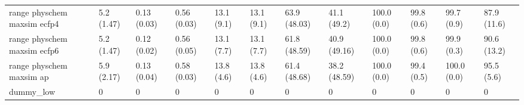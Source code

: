 \begin{tabular}{llllllllllll}
range physchem maxsim ecfp4 & {\cellcolor[HTML]{F1FAFC}} \color[HTML]{000000} 5.2 (1.47) & {\cellcolor[HTML]{E0F3F5}} \color[HTML]{000000} 0.13 (0.03) & {\cellcolor[HTML]{54B88E}} \color[HTML]{F1F1F1} 0.56 (0.03) & {\cellcolor[HTML]{E4F5F8}} \color[HTML]{000000} 13.1 (9.1) & {\cellcolor[HTML]{E4F5F8}} \color[HTML]{000000} 13.1 (9.1) & {\cellcolor[HTML]{3EAA70}} \color[HTML]{F1F1F1} 63.9 (48.03) & {\cellcolor[HTML]{8AD2BE}} \color[HTML]{000000} 41.1 (49.2) & {\cellcolor[HTML]{00441B}} \color[HTML]{F1F1F1} 100.0 (0.0) & {\cellcolor[HTML]{00441B}} \color[HTML]{F1F1F1} 99.8 (0.6) & {\cellcolor[HTML]{00441B}} \color[HTML]{F1F1F1} 99.7 (0.9) & {\cellcolor[HTML]{006B2B}} \color[HTML]{F1F1F1} 87.9 (11.6) \\
range physchem maxsim ecfp6 & {\cellcolor[HTML]{F0F9FB}} \color[HTML]{000000} 5.2 (1.47) & {\cellcolor[HTML]{E1F4F6}} \color[HTML]{000000} 0.12 (0.02) & {\cellcolor[HTML]{55B98F}} \color[HTML]{F1F1F1} 0.56 (0.05) & {\cellcolor[HTML]{E4F5F8}} \color[HTML]{000000} 13.1 (7.7) & {\cellcolor[HTML]{E4F5F8}} \color[HTML]{000000} 13.1 (7.7) & {\cellcolor[HTML]{43AF78}} \color[HTML]{F1F1F1} 61.8 (48.59) & {\cellcolor[HTML]{8CD2BF}} \color[HTML]{000000} 40.9 (49.16) & {\cellcolor[HTML]{00441B}} \color[HTML]{F1F1F1} 100.0 (0.0) & {\cellcolor[HTML]{00441B}} \color[HTML]{F1F1F1} 99.8 (0.6) & {\cellcolor[HTML]{00441B}} \color[HTML]{F1F1F1} 99.9 (0.3) & {\cellcolor[HTML]{006328}} \color[HTML]{F1F1F1} 90.6 (13.2) \\
range physchem maxsim ap & {\cellcolor[HTML]{EFF9FB}} \color[HTML]{000000} 5.9 (2.17) & {\cellcolor[HTML]{EDF8FB}} \color[HTML]{000000} 0.13 (0.04) & {\cellcolor[HTML]{4EB586}} \color[HTML]{F1F1F1} 0.58 (0.03) & {\cellcolor[HTML]{E3F4F7}} \color[HTML]{000000} 13.8 (4.6) & {\cellcolor[HTML]{E3F4F7}} \color[HTML]{000000} 13.8 (4.6) & {\cellcolor[HTML]{44AF79}} \color[HTML]{F1F1F1} 61.4 (48.68) & {\cellcolor[HTML]{97D7C7}} \color[HTML]{000000} 38.2 (48.59) & {\cellcolor[HTML]{00441B}} \color[HTML]{F1F1F1} 100.0 (0.0) & {\cellcolor[HTML]{00451C}} \color[HTML]{F1F1F1} 99.4 (0.5) & {\cellcolor[HTML]{00441B}} \color[HTML]{F1F1F1} 100.0 (0.0) & {\cellcolor[HTML]{005221}} \color[HTML]{F1F1F1} 95.5 (5.6) \\
dummy_low & {\cellcolor[HTML]{F7FCFD}} \color[HTML]{000000} 0 & {\cellcolor[HTML]{F7FCFD}} \color[HTML]{000000} 0 & {\cellcolor[HTML]{F7FCFD}} \color[HTML]{000000} 0 & {\cellcolor[HTML]{F7FCFD}} \color[HTML]{000000} 0 & {\cellcolor[HTML]{F7FCFD}} \color[HTML]{000000} 0 & {\cellcolor[HTML]{F7FCFD}} \color[HTML]{000000} 0 & {\cellcolor[HTML]{F7FCFD}} \color[HTML]{000000} 0 & {\cellcolor[HTML]{F7FCFD}} \color[HTML]{000000} 0 & {\cellcolor[HTML]{F7FCFD}} \color[HTML]{000000} 0 & {\cellcolor[HTML]{F7FCFD}} \color[HTML]{000000} 0 & {\cellcolor[HTML]{F7FCFD}} \color[HTML]{000000} 0 \\

\end{tabular}
